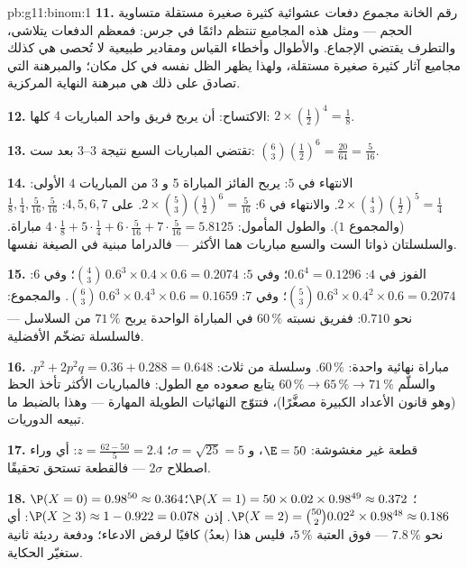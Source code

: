 \begin{solution}{pb:g11:binom:1}
\textbf{11.} رقم الخانة \emph{مجموع} دفعات عشوائية كثيرة صغيرة
مستقلة متساوية الحجم --- ومثل هذه المجاميع تنتظم دائمًا
في جرس: فمعظم الدفعات يتلاشى، والتطرف
يقتضي الإجماع. والأطوال وأخطاء القياس ومقادير طبيعية
لا تُحصى هي كذلك مجاميع آثار كثيرة صغيرة مستقلة،
ولهذا يظهر الظل نفسه في كل مكان؛
والمبرهنة التي تصادق على ذلك هي مبرهنة النهاية المركزية.

\textbf{12.} الاكتساح: أن يربح فريق واحد المباريات $4$ كلها:
$2 \times \left(\frac12\right)^4 = \frac18$.

\textbf{13.} تقتضي المباريات السبع نتيجة $3$--$3$ بعد ست:
$\binom63 \left(\frac12\right)^6 = \frac{20}{64} =
\frac{5}{16}$.

\textbf{14.} الانتهاء في $5$: يربح الفائز المباراة 5 و $3$ من
المباريات $4$ الأولى:
$2 \times \binom43 \left(\frac12\right)^5 = \frac14$. والانتهاء في
$6$: $2 \times \binom53 \left(\frac12\right)^6 = \frac{5}{16}$.
 على $4, 5, 6, 7$:
$\frac18, \frac14, \frac{5}{16}, \frac{5}{16}$ (والمجموع $1$).
والطول المأمول: $4 \cdot \frac18 + 5 \cdot \frac14 + 6 \cdot
\frac{5}{16} + 7 \cdot \frac{5}{16} = 5.8125$ مباراة. والسلسلتان ذواتا الست
والسبع مباريات هما الأكثر  --- فالدراما مبنية في
الصيغة نفسها.

\textbf{15.} الفوز في $4$: $0.6^4 = 0.1296$؛ وفي $5$:
$\binom43\,0.6^3 \times 0.4 \times 0.6 = 0.2074$؛ وفي $6$:
$\binom53\,0.6^3 \times 0.4^2 \times 0.6 = 0.2074$؛ وفي $7$:
$\binom63\,0.6^3 \times 0.4^3 \times 0.6 = 0.1659$. والمجموع:
نحو $0.710$: ففريق نسبته $60\,\%$ في المباراة الواحدة يربح $71\,\%$ من
السلاسل --- فالسلسلة تضخّم الأفضلية.

\textbf{16.} مباراة نهائية واحدة: $60\,\%$. وسلسلة من ثلاث:
$p^2 + 2p^2 q = 0.36 + 0.288 = 0.648$. والسلّم
$60\,\% \to 65\,\% \to 71\,\%$ يتابع صعوده مع الطول: فالمباريات
الأكثر تأخذ  الحظ (وهو قانون الأعداد الكبيرة مصغَّرًا)،
فتتوّج النهائيات الطويلة المهارة --- وهذا بالضبط ما تبيعه
الدوريات.

\textbf{17.} قطعة غير مغشوشة: $\E = 50$، و $\sigma = \sqrt{25} = 5$؛
$z = \frac{62 - 50}{5} = 2.4$: أي وراء اصطلاح $2\sigma$
--- فالقطعة تستحق تحقيقًا.

\textbf{18.} $\P(X = 0) = 0.98^{50} \approx 0.364$؛
$\P(X = 1) = 50 \times 0.02 \times 0.98^{49} \approx 0.372$؛
$\P(X = 2) = \binom{50}{2} 0.02^2 \times 0.98^{48} \approx
0.186$. إذن $\P(X \geq 3) \approx 1 - 0.922 = 0.078$: أي نحو
$7.8\,\%$ --- فوق العتبة $5\,\%$، فليس هذا (بعدُ)
كافيًا لرفض الادعاء؛ ودفعة رديئة ثانية ستغيّر
الحكاية.


\end{solution}
